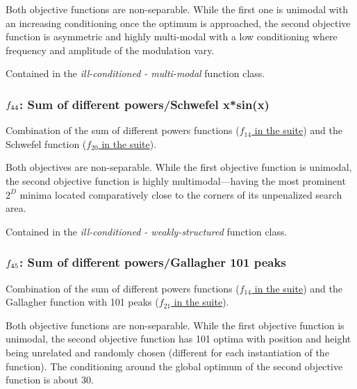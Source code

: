 \documentclass[letterpaper,12pt,english]{article}
\begin{document}
Both objective functions are non-separable. While the first one
is unimodal with an increasing conditioning once the optimum is approached,
the second objective function is asymmetric and highly multi-modal with a
low conditioning where frequency and amplitude of the modulation vary.

Contained in the \emph{ill-conditioned - multi-modal} function class.


\subsubsection{\protect\(f_{44}\protect\): Sum of different powers/Schwefel x*sin(x)}
\label{index:f44}\label{index:sum-of-different-powers-schwefel-x-sin-x}
Combination of the sum of different powers functions
(\href{http://coco.lri.fr/downloads/download15.03/bbobdocfunctions.pdf\#page=70}{\(f_{14}\) in the  suite}) and the Schwefel function (\href{http://coco.lri.fr/downloads/download15.03/bbobdocfunctions.pdf\#page=100}{\(f_{20}\) in the  suite}).

Both objectives are non-separable.
While the first objective function is unimodal,
the second objective function is highly multimodal---having the most
prominent \(2^D\) minima located comparatively close to the corners
of its unpenalized search area.

Contained in the \emph{ill-conditioned - weakly-structured} function class.


\subsubsection{\protect\(f_{45}\protect\): Sum of different powers/Gallagher 101 peaks}
\label{index:sum-of-different-powers-gallagher-101-peaks}\label{index:f45}
Combination of the sum of different powers functions
(\href{http://coco.lri.fr/downloads/download15.03/bbobdocfunctions.pdf\#page=70}{\(f_{14}\) in the  suite}) and the Gallagher function with
101 peaks (\href{http://coco.lri.fr/downloads/download15.03/bbobdocfunctions.pdf\#page=105}{\(f_{21}\) in the  suite}).

Both objective functions are non-separable.
While the first objective function is unimodal, the second objective function
has 101 optima with position and height being unrelated and randomly
chosen (different for each instantiation of the function). The
conditioning around the global optimum of the second objective function
is about 30.
\end{document}
